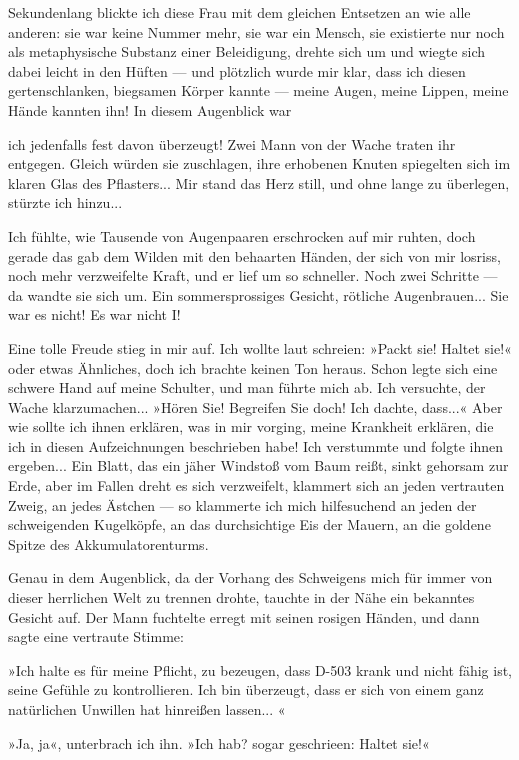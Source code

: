 Sekundenlang blickte ich diese Frau mit dem gleichen Entsetzen an
wie alle anderen: sie war keine Nummer mehr, sie war ein Mensch,
sie existierte nur noch als metaphysische Substanz einer
Beleidigung, drehte sich um und wiegte sich dabei leicht in den
Hüften — und plötzlich wurde mir klar, dass ich diesen
gertenschlanken, biegsamen Körper kannte — meine Augen, meine
Lippen, meine Hände kannten ihn! In diesem Augenblick war

ich jedenfalls fest davon überzeugt! Zwei Mann von der Wache traten
ihr entgegen. Gleich würden sie zuschlagen, ihre erhobenen Knuten
spiegelten sich im klaren Glas des Pflasters... Mir stand das Herz
still, und ohne lange zu überlegen, stürzte ich hinzu...

Ich fühlte, wie Tausende von Augenpaaren erschrocken auf mir
ruhten, doch gerade das gab dem Wilden mit den behaarten Händen,
der sich von mir losriss, noch mehr verzweifelte Kraft, und er lief
um so schneller. Noch zwei Schritte — da wandte sie sich um. Ein
sommersprossiges Gesicht, rötliche Augenbrauen... Sie war es nicht!
Es war nicht I!

Eine tolle Freude stieg in mir auf. Ich wollte laut schreien:
»Packt sie! Haltet sie!« oder etwas Ähnliches, doch ich brachte
keinen Ton heraus. Schon legte sich eine schwere Hand auf meine
Schulter, und man führte mich ab. Ich versuchte, der Wache
klarzumachen... »Hören Sie! Begreifen Sie doch! Ich dachte,
dass...« Aber wie sollte ich ihnen erklären, was in mir vorging,
meine Krankheit erklären, die ich in diesen Aufzeichnungen
beschrieben habe! Ich verstummte und folgte ihnen ergeben... Ein
Blatt, das ein jäher Windstoß vom Baum reißt, sinkt gehorsam zur
Erde, aber im Fallen dreht es sich verzweifelt, klammert sich an
jeden vertrauten Zweig, an jedes Ästchen — so klammerte ich mich
hilfesuchend an jeden der schweigenden Kugelköpfe, an das
durchsichtige Eis der Mauern, an die goldene Spitze des
Akkumulatorenturms.

Genau in dem Augenblick, da der Vorhang des Schweigens mich für
immer von dieser herrlichen Welt zu trennen drohte, tauchte in der
Nähe ein bekanntes Gesicht auf. Der Mann fuchtelte erregt mit
seinen rosigen Händen, und dann sagte eine vertraute Stimme:

»Ich halte es für meine Pflicht, zu bezeugen, dass D-503 krank und
nicht fähig ist, seine Gefühle zu kontrollieren. Ich bin überzeugt,
dass er sich von einem ganz natürlichen Unwillen hat hinreißen
lassen... «

»Ja, ja«, unterbrach ich ihn. »Ich hab? sogar geschrieen: Haltet
sie!«

